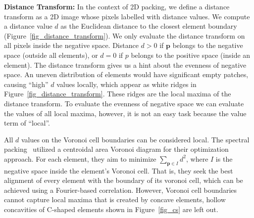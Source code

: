 

\newtext
{
\textbf{Distance Transform:} 
In the context of 2D packing, we define a distance transform as a 2D image whose pixels labelled with distance values. 
We compute a distance value $d$ as the Euclidean distance to the closest element boundary (Figure~\ref{fig_distance_transform}).
We only evaluate the distance transform on all pixels inside the negative space.
Distance $d > 0$ if $\bm{p}$ belongs to the negative space (outside all elements), 
or $d = 0$ if $p$ belongs to the positive space (inside an element).
The distance transform gives us a hint about the evenness of negative space.
An uneven distribution of elements would have significant empty patches,
causing ``high'' $d$ values locally, which appear as white ridges in Figure~\ref{fig_distance_transform}.
These ridges are the local maxima of the distance transform. 
To evaluate the evenness of negative space we can evaluate the values of all local maxima, 
however, it is not an easy task because the value term of ``local''.
}


\newtext
{
All $d$ values on the Voronoi cell boundaries can be considered local.
The spectral packing~\cite{Dalal2006} utilized a centroidal area Voronoi diagram for their optimization approach.
For each element, they aim to minimize $\sum_{\bm{p} \in I} d^2$,
where $I$ is the negative space inside the element's Voronoi cell.
That is, they seek the best alignment of every element with the boundary of its voronoi cell,
which can be achieved using a Fourier-based correlation.
However, Voronoi cell boundaries cannot capture local maxima that is created by concave elements,
hollow concavities of C-shaped elements shown in Figure~\ref{fig_cs} are left out.
}

